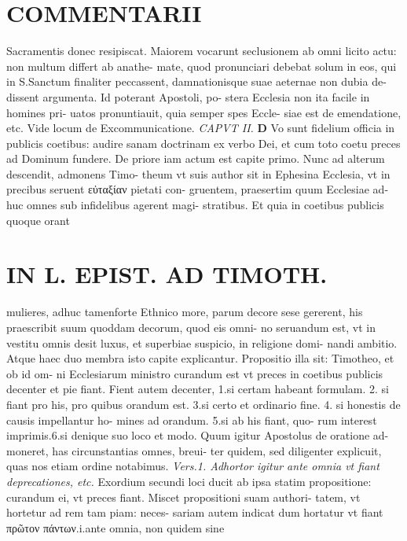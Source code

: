 \documentclass{article}
\begin{document}
\begin{pages}
\section*{COMMENTARII }\pstart Sacramentis donec resipiscat.  \pend\pstart Maiorem vocarunt seclusionem ab omni licito actu: non multum differt ab anathe- mate, quod pronunciari debebat solum in eos, qui in S.Sanctum finaliter peccassent, damnationisque suae aeternae non dubia de- dissent argumenta. Id poterant Apostoli, po- stera Ecclesia non ita facile in homines pri- uatos pronuntiauit, quia semper spes Eccle- siae est de emendatione, etc. Vide locum de Excommunicatione.  \pend
\textit{CAPVT II. }
\textbf{D }\pstart Vo sunt fidelium officia in publicis coetibus: audire sanam doctrinam ex verbo Dei, et cum toto coetu preces ad Dominum fundere. De priore iam actum est capite primo. Nunc ad alterum descendit, admonens Timo- theum vt suis author sit in Ephesina Ecclesia, vt in precibus seruent εὐταξίαν pietati con- gruentem, praesertim quum Ecclesiae ad- huc omnes sub infidelibus agerent magi- stratibus.  \pend\pstart Et quia in coetibus publicis quoque orant  \pend
\section*{IN L. EPIST. AD TIMOTH. }
\marginpar{[ p.33 ]}\pstart mulieres, adhuc tamenforte Ethnico more, parum decore sese gererent, his praescribit suum quoddam decorum, quod eis omni- no seruandum est, vt in vestitu omnis desit luxus, et superbiae suspicio, in religione domi- nandi ambitio. Atque haec duo membra isto capite explicantur.  \pend\pstart Propositio illa sit: Timotheo, et ob id om- ni Ecclesiarum ministro curandum est vt preces in coetibus publicis decenter et pie fiant. Fient autem decenter, 1.si certam habeant formulam. 2. si fiant pro his, pro quibus orandum est. 3.si certo et ordinario fine. 4. si honestis de causis impellantur ho- mines ad orandum. 5.si ab his fiant, quo- rum interest imprimis.6.si denique suo loco et modo.  \pend\pstart Quum igitur Apostolus de oratione ad- moneret, has circunstantias omnes, breui- ter quidem, sed diligenter explicuit, quas nos etiam ordine notabimus.  \pend
\textit{Vers.1. Adhortor igitur ante omnia vt fiant deprecationes, etc. }\pstart Exordium secundi loci ducit ab ipsa statim propositione: curandum ei, vt preces fiant. Miscet propositioni suam authori- tatem, vt hortetur ad rem tam piam: neces- sariam autem indicat dum hortatur vt fiant πρῶτον πάντων.i.ante omnia, non quidem sine  \pend

\end{pages}
\end{document}
